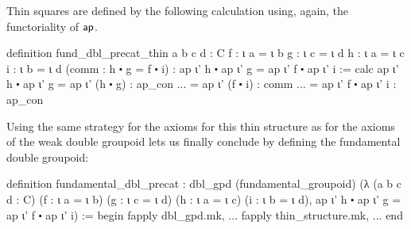 Thin squares are defined by the following calculation using, again, the functoriality
of $\mathsf{ap}$.
\begin{leancodebr}
  definition fund_dbl_precat_thin {a b c d : C}
    {f : ι a = ι b} {g : ι c = ι d} {h : ι a = ι c} {i : ι b = ι d}
    (comm : h ⬝ g = f ⬝ i) :
    ap ι' h ⬝ ap ι' g = ap ι' f ⬝ ap ι' i :=
  calc ap ι' h ⬝ ap ι' g = ap ι' (h ⬝ g) : ap_con
                    ... = ap ι' (f ⬝ i) : comm
                    ... = ap ι' f ⬝ ap ι' i : ap_con
\end{leancodebr}

Using the same strategy for the axioms for this thin structure as for the axioms
of the weak double groupoid lets us finally conclude by defining the fundamental
double groupoid:
\begin{leancodebr}
  definition fundamental_dbl_precat : dbl_gpd (fundamental_groupoid)
    (λ (a b c d : C) (f : ι a = ι b) (g : ι c = ι d) (h : ι a = ι c) (i : ι b = ι d),
      ap ι' h ⬝ ap ι' g = ap ι' f ⬝ ap ι' i) :=
  begin
    fapply dbl_gpd.mk,
      ...
    fapply thin_structure.mk,
      ...
  end
\end{leancodebr}

